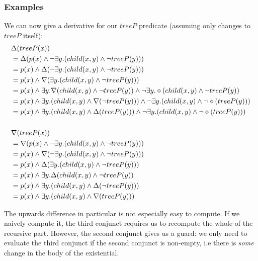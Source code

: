 \subsubsection{Examples}

We can now give a derivative for our $treeP$ predicate (assuming only changes to
$treeP$ itself):
\begin{align*}
  &\Delta(treeP(x))\\
  &= \Delta(p(x) \wedge \neg \exists y. (child(x, y) \wedge \neg treeP(y)))\\
  &= p(x) \wedge \Delta(\neg \exists y. (child(x, y) \wedge \neg treeP(y)))\\
  &= p(x) \wedge \nabla(\exists y. (child(x, y) \wedge \neg treeP(y)))\\
  &= p(x) \wedge \exists y. \nabla(child(x, y) \wedge \neg treeP(y)) \wedge \neg \exists y. \diamond(child(x,y) \wedge \neg treeP(y))\\
  &= p(x) \wedge \exists y. (child(x, y) \wedge \nabla(\neg treeP(y))) \wedge \neg \exists y. (child(x,y) \wedge \neg \diamond(treeP(y)))\\
  &= p(x) \wedge \exists y. (child(x, y) \wedge \Delta(treeP(y))) \wedge \neg \exists y. (child(x,y) \wedge \neg \diamond(treeP(y)))\\
  \\
  &\nabla(treeP(x))\\
  &= \nabla(p(x) \wedge \neg \exists y. (child(x, y) \wedge \neg treeP(y)))\\
  &= p(x) \wedge \nabla(\neg \exists y. (child(x, y) \wedge \neg treeP(y)))\\
  &= p(x) \wedge \Delta(\exists y. (child(x, y) \wedge \neg treeP(y)))\\
  &= p(x) \wedge \exists y. \Delta(child(x, y) \wedge \neg treeP(y))\\
  &= p(x) \wedge \exists y. (child(x, y) \wedge \Delta(\neg treeP(y)))\\
  &= p(x) \wedge \exists y. (child(x, y) \wedge \nabla(treeP(y)))
\end{align*}

The upwards difference in particular is not especially easy to compute. If we naively compute it, the
third conjunct requires us to recompute the whole of the recursive part. However,
the second conjunct gives us a
guard: we only need to evaluate the third conjunct if the second conjunct is
non-empty, i.e there is \emph{some} change in the body of the existential.

